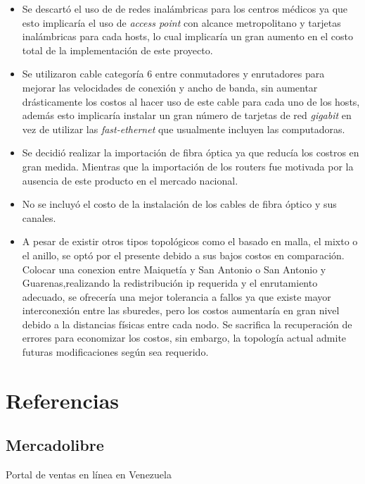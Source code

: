 \documentclass[]{article}
\begin{document}
\begin{itemize}
\itemsep1pt\parskip0pt
\item
  Se descartó el uso de de redes inalámbricas para los centros médicos
  ya que esto implicaría el uso de \emph{access point} con alcance
  metropolitano y tarjetas inalámbricas para cada hosts, lo cual
  implicaría un gran aumento en el costo total de la implementación de
  este proyecto.
\item
  Se utilizaron cable categoría 6 entre conmutadores y enrutadores para
  mejorar las velocidades de conexión y ancho de banda, sin aumentar
  drásticamente los costos al hacer uso de este cable para cada uno de
  los hosts, además esto implicaría instalar un gran número de tarjetas
  de red \emph{gigabit} en vez de utilizar las \emph{fast-ethernet} que
  usualmente incluyen las computadoras.
\item
  Se decidió realizar la importación de fibra óptica ya que reducía los
  costros en gran medida. Mientras que la importación de los routers fue
  motivada por la ausencia de este producto en el mercado nacional.
\item
  No se incluyó el costo de la instalación de los cables de fibra óptico
  y sus canales.
\item
  A pesar de existir otros tipos topológicos como el basado en malla, el
  mixto o el anillo, se optó por el presente debido a sus bajos costos
  en comparación. Colocar una conexion entre Maiquetía y San Antonio o
  San Antonio y Guarenas,realizando la redistribución ip requerida y el
  enrutamiento adecuado, se ofrecería una mejor tolerancia a fallos ya
  que existe mayor interconexión entre las sburedes, pero los costos
  aumentaría en gran nivel debido a la distancias físicas entre cada
  nodo. Se sacrifica la recuperación de errores para economizar los
  costos, sin embargo, la topología actual admite futuras modificaciones
  según sea requerido.
\end{itemize}

\section{Referencias}\label{referencias}

\subsection{Mercadolibre}\label{mercadolibre}

Portal de ventas en línea en Venezuela
\end{document}
